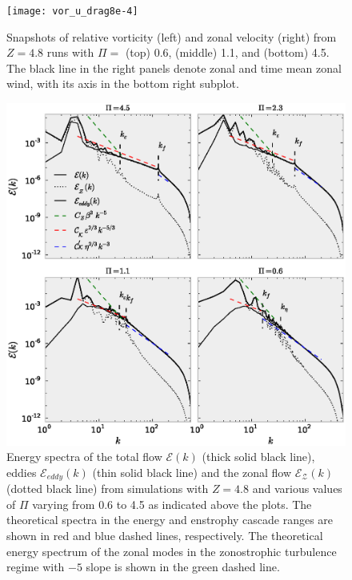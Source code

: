 \documentclass{jfm}
\begin{document}
\begin{figure}
\begin{center}
\texttt{[image: vor\_u\_drag8e-4]}\caption{Snapshots of relative vorticity (left) and zonal velocity (right)
from $Z=4.8$ runs with $\Pi=$ (top) 0.6, (middle) 1.1, and (bottom)
4.5. The black line in the right panels denote zonal and time mean
zonal wind, with its axis in the bottom right subplot.}
\label{vor_u_snapshot_drag8e-4}
\end{center}
\end{figure}


\begin{figure}
\begin{center}
\includegraphics[width=6in]{E_ZKE_EKE_spectra_drag8e-4}\caption{Energy spectra of the total flow $\mathcal{E}(k)$ (thick solid
black line), eddies $\mathcal{E}_{eddy}(k)$ (thin solid black line)
and the zonal flow $\mathcal{E}_{\mathcal{Z}}(k)$ (dotted black line)
from simulations with $Z=4.8$ and various values of $\Pi$ varying
from 0.6 to 4.5 as indicated above the plots. The theoretical spectra
in the energy and enstrophy cascade ranges are shown in red and blue dashed
lines, respectively. The theoretical energy spectrum of the zonal modes in the 
zonostrophic turbulence regime with $-5$ slope is shown in the green
dashed line.}
\label{E_EKE_ZKE_spectrum_drag8e-4}
\end{center}
\end{figure}
\end{document}

